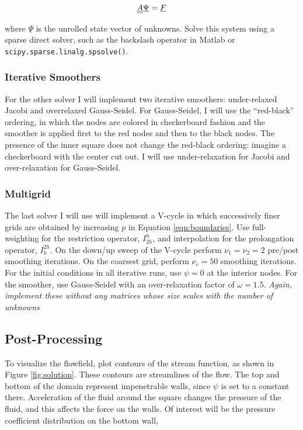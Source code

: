         \begin{equation}
            \underline{\underline{A}} \underline{\Psi} = \underline{F}
            \label{eqn:boundaries}
        \end{equation}

        where $\underline{\Psi}$ is the unrolled state vector of unknowns. Solve this system using a sparse direct
        solver, such as the backslash operator in Matlab or {\tt scipy.sparse.linalg.spsolve()}.

        \subsubsection{Iterative Smoothers}
        For the other solver I will implement two iterative smoothers: under-relaxed Jacobi and overrelaxed Gauss-Seidel. For Gauss-Seidel, I will use the “red-black” ordering, in which the nodes are colored in checkerboard fashion and the smoother is applied first to the red nodes and then to the black nodes. The presence of the inner square does not change the red-black ordering: imagine a checkerboard with the center cut out. I will use under-relaxation for Jacobi and over-relaxation for Gauss-Seidel.

        \subsubsection{Multigrid}
        The last solver I will use will implement a V-cycle in which successively finer grids are obtained by increasing $p$ in Equation \ref{eqn:boundaries}. Use full-weighting for the restriction operator, $I_{2h}^h$, and interpolation for the prolongation operator, $I_h^{2h}$. On the down/up sweep of the V-cycle perform $\nu_1 = \nu_2 = 2$ pre/post smoothing iterations. On the coarsest grid, perform $\nu_c = 50$ smoothing iterations. For the initial conditions in all iterative runs, use $\psi = 0$ at the interior nodes. For the smoother, use Gauss-Seidel with an over-relaxation factor of $\omega = 1.5$. \textit{Again, implement these without any matrices whose size scales with the number of unknowns}


    \subsection{Post-Processing}
    To visualize the flowfield, plot contours of the stream function, as shown in Figure \ref{fig:solution}. These contours are streamlines of the flow. The top and bottom of the domain represent impenetrable walls, since $\psi$ is set to a constant there. Acceleration of the fluid around the square changes the pressure of the fluid, and this affects the force on the walls. Of interest will be the pressure coefficient distribution on the bottom wall,

